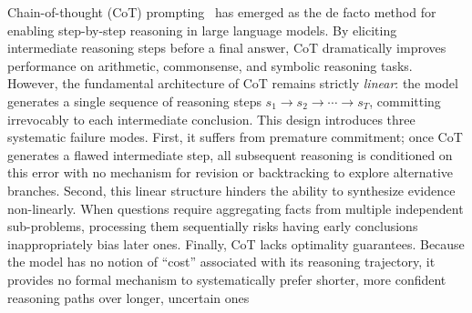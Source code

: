\documentclass[11pt]{article}
\begin{document}


Chain-of-thought (CoT) prompting~\cite{wei2022chain} has emerged as the de facto method for enabling step-by-step reasoning in large language models. By eliciting intermediate reasoning steps before a final answer, CoT dramatically improves performance on arithmetic, commonsense, and symbolic reasoning tasks. However, the fundamental architecture of CoT remains strictly \emph{linear}: the model generates a single sequence of reasoning steps $s_1 \to s_2 \to \cdots \to s_T$, committing irrevocably to each intermediate conclusion. This design introduces three systematic failure modes. First, it suffers from premature commitment; once CoT generates a flawed intermediate step, all subsequent reasoning is conditioned on this error with no mechanism for revision or backtracking to explore alternative branches. Second, this linear structure hinders the ability to synthesize evidence non-linearly. When questions require aggregating facts from multiple independent sub-problems, processing them sequentially risks having early conclusions inappropriately bias later ones. Finally, CoT lacks optimality guarantees. Because the model has no notion of ``cost'' associated with its reasoning trajectory, it provides no formal mechanism to systematically prefer shorter, more confident reasoning paths over longer, uncertain ones
\end{document}
